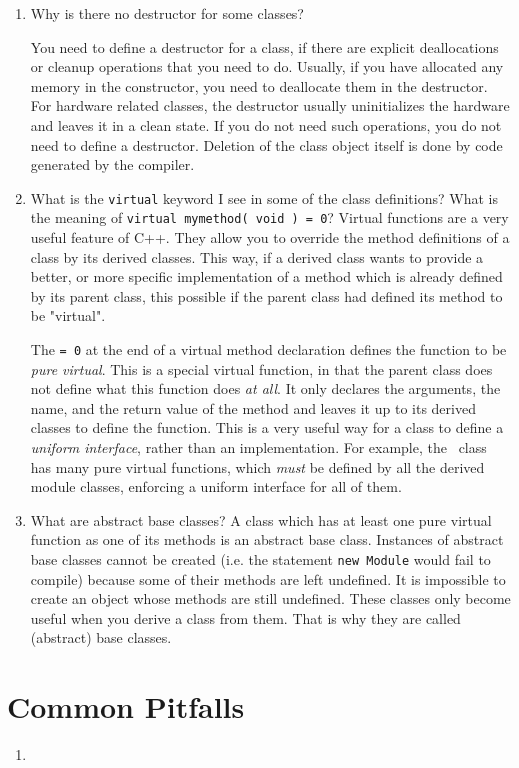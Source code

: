 \begin{enumerate}
\item{Why is there no destructor for some classes?}\par
You need to define a destructor for a class, if there are explicit
deallocations or cleanup operations that you need to do. Usually, if you
have allocated any memory in the constructor, you need to deallocate them in
the destructor. For hardware related classes, the destructor usually
uninitializes the hardware and leaves it in a clean state. If you do not
need such operations, you do not need to define a destructor. Deletion of
the class object itself is done by code generated by the compiler.

\item{What is the {\tt virtual} keyword I see in some of the class
    definitions? What is the meaning of {\tt virtual mymethod( void ) = 0}?}
Virtual functions are a very useful feature of C++. They allow you to
override the method definitions of a class by its derived classes. This way,
if a derived class wants to provide a better, or more specific
implementation of a method which is already defined by its parent class,
this possible if the parent class had defined its method to be "virtual".

The {\tt = 0} at the end of a virtual method declaration defines the
function to be {\em pure virtual}. This is a special virtual function, in
that the parent class does not define what this function does {\em at
  all}. It only declares the arguments, the name, and the return value of
the method and leaves it up to its derived classes to define the
function. This is a very useful way for a class to define a {\em uniform 
  interface}, rather than an implementation. For example, the \Module\ class
has many pure virtual functions, which {\em must} be defined by all the
derived module classes, enforcing a uniform interface for all of them.

\item{What are abstract base classes?}
A class which has at least one pure virtual function as one of its methods
is an abstract base class. Instances of abstract base classes cannot be
created (i.e. the statement {\tt new Module} would fail to compile) because
some of their methods are left undefined. It is impossible to create an
object whose methods are still undefined. These classes only become useful
when you derive a class from them. That is why they are called (abstract)
base classes.
\end{enumerate}

\section{Common Pitfalls}

\begin{enumerate}
\item
\end{enumerate}

